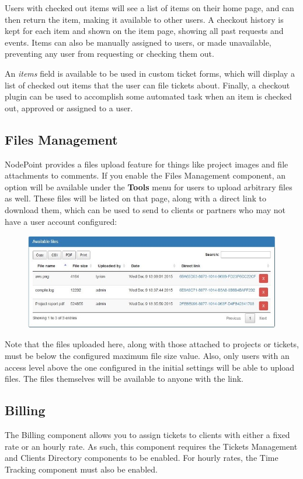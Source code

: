 \documentclass[11pt]{article}
\begin{document}
Users with checked out items will see a list of items on their home page, and can then return the item, making it available to other users. A checkout history is kept for each item and shown on the item page, showing all past requests and events. Items can also be manually assigned to users, or made unavailable, preventing any user from requesting or checking them out.

An \textit{items} field is available to be used in custom ticket forms, which will display a list of checked out items that the user can file tickets about. Finally, a checkout plugin can be used to accomplish some automated task when an item is checked out, approved or assigned to a user.

\subsection{Files Management}
NodePoint provides a files upload feature for things like project images and file attachments to comments. If you enable the Files Management component, an option will be available under the \textbf{Tools} menu for users to upload arbitrary files as well. These files will be listed on that page, along with a direct link to download them, which can be used to send to clients or partners who may not have a user account configured:

\begin{figure}[h]
\includegraphics{files.jpg}
\end{figure}

Note that the files uploaded here, along with those attached to projects or tickets, must be below the configured maximum file size value. Also, only users with an access level above the one configured in the initial settings will be able to upload files. The files themselves will be available to anyone with the link.

\subsection{Billing}
The Billing component allows you to assign tickets to clients with either a fixed rate or an hourly rate. As such, this component requires the Tickets Management and Clients Directory components to be enabled. For hourly rates, the Time Tracking component must also be enabled.
\end{document}
